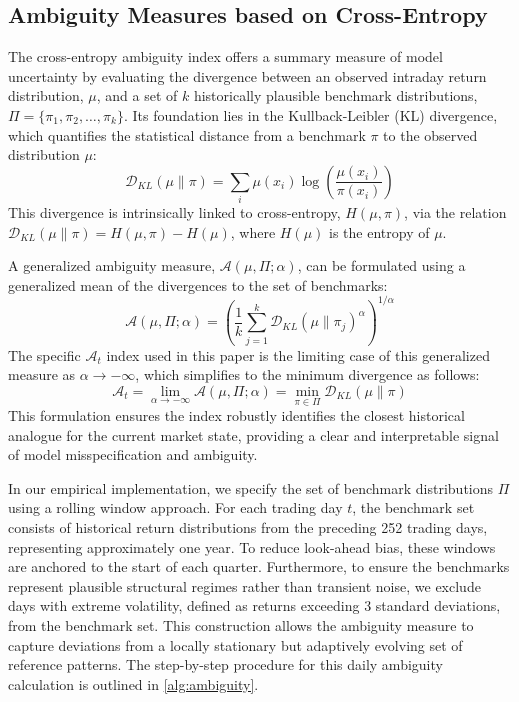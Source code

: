 \documentclass[preprint,12pt,authoryear]{elsarticle}
\begin{document}
\subsection{Ambiguity Measures based on Cross-Entropy}
The cross-entropy ambiguity index offers a summary measure of model uncertainty by evaluating the divergence between an observed intraday return distribution, $\mu$, and a set of $k$ historically plausible benchmark distributions, $\Pi = \{\pi_1, \pi_2, \dots, \pi_k\}$. Its foundation lies in the Kullback-Leibler (KL) divergence, which quantifies the statistical distance from a benchmark $\pi$ to the observed distribution $\mu$:
\begin{equation}
    \mathcal{D}_{KL}(\mu \| \pi) = \sum_{i} \mu(x_i) \log\left(\frac{\mu(x_i)}{\pi(x_i)}\right)
\end{equation}
This divergence is intrinsically linked to cross-entropy, $H(\mu, \pi)$, via the relation $\mathcal{D}_{KL}(\mu \| \pi) = H(\mu, \pi) - H(\mu)$, where $H(\mu)$ is the entropy of $\mu$.

A generalized ambiguity measure, $\mathcal{A}(\mu, \Pi; \alpha)$, can be formulated using a generalized mean of the divergences to the set of benchmarks:
\begin{equation}
    \mathcal{A}(\mu, \Pi; \alpha) = \left( \frac{1}{k} \sum_{j=1}^{k} \mathcal{D}_{KL}(\mu \| \pi_j)^{\alpha} \right)^{1/\alpha}
\end{equation}
The specific $\mathcal{A}_t$ index used in this paper is the limiting case of this generalized measure as $\alpha \to -\infty$, which simplifies to the minimum divergence as follows:
\begin{equation}
    \mathcal{A}_t = \lim_{\alpha \to -\infty} \mathcal{A}(\mu, \Pi; \alpha) = \min_{\pi \in \Pi} \mathcal{D}_{KL}(\mu \| \pi)
\end{equation}
This formulation ensures the index robustly identifies the closest historical analogue for the current market state, providing a clear and interpretable signal of model misspecification and ambiguity.

In our empirical implementation, we specify the set of benchmark distributions $\Pi$ using a rolling window approach. For each trading day $t$, the benchmark set consists of historical return distributions from the preceding 252 trading days, representing approximately one year. To reduce look-ahead bias, these windows are anchored to the start of each quarter. Furthermore, to ensure the benchmarks represent plausible structural regimes rather than transient noise, we exclude days with extreme volatility, defined as returns exceeding 3 standard deviations, from the benchmark set. This construction allows the ambiguity measure to capture deviations from a locally stationary but adaptively evolving set of reference patterns. The step-by-step procedure for this daily ambiguity calculation is outlined in \cref{alg:ambiguity}.
\end{document}
